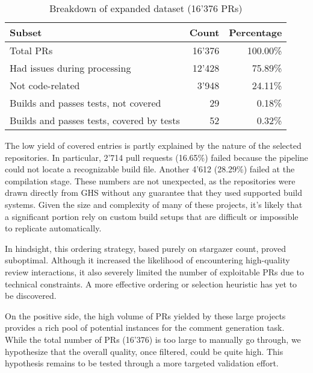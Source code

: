 \begin{table}[ht]
	\centering
	\begin{tabular}{lrr}
		\toprule
		\textbf{Subset}                           & \textbf{Count} & \textbf{Percentage} \\
		\midrule
		Total PRs                                 & 16'376         & 100.00\%            \\
		Had issues during processing              & 12'428         & 75.89\%             \\
		Not code-related                          & 3'948          & 24.11\%             \\
		Builds and passes tests, not covered      & 29             & 0.18\%              \\
		Builds and passes tests, covered by tests & 52             & 0.32\%              \\
		\bottomrule
	\end{tabular}
	\caption{Breakdown of expanded dataset (16'376 PRs)}
	\label{tab:expanded-distribution}
\end{table}

The low yield of covered entries is partly explained by the nature of the selected repositories. In
particular, 2'714 pull requests (16.65\%) failed because the pipeline could not locate a
recognizable build file. Another 4'612 (28.29\%) failed at the compilation stage. These numbers are
not unexpected, as the repositories were drawn directly from GHS without any guarantee that they
used supported build systems. Given the size and complexity of many of these projects, it's likely
that a significant portion rely on custom build setups that are difficult or impossible to replicate
automatically.

In hindsight, this ordering strategy, based purely on stargazer count, proved suboptimal. Although
it increased the likelihood of encountering high-quality review interactions, it also severely
limited the number of exploitable PRs due to technical constraints. A more effective ordering or
selection heuristic has yet to be discovered.

On the positive side, the high volume of PRs yielded by these large projects provides a rich pool of
potential instances for the comment generation task. While the total number of PRs (16'376) is too
large to manually go through, we hypothesize that the overall quality, once filtered, could be quite
high. This hypothesis remains to be tested through a more targeted validation effort.

